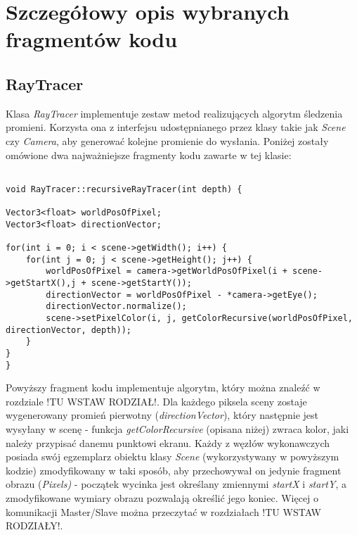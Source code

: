 \section{Szczegółowy opis wybranych fragmentów kodu}
	\subsection{RayTracer}

Klasa \emph{RayTracer} implementuje zestaw metod realizujących algorytm śledzenia promieni. Korzysta ona z interfejsu udostępnianego przez klasy takie jak \emph{Scene} czy \emph{Camera}, aby generować kolejne promienie do wysłania. Poniżej zostały omówione dwa najważniejsze fragmenty kodu zawarte w tej klasie:
	
\begin{lstlisting}[caption={Fragment klasy \emph{RayTracer}}]

void RayTracer::recursiveRayTracer(int depth) {

Vector3<float> worldPosOfPixel;
Vector3<float> directionVector;

for(int i = 0; i < scene->getWidth(); i++) {
    for(int j = 0; j < scene->getHeight(); j++) {
        worldPosOfPixel = camera->getWorldPosOfPixel(i + scene->getStartX(),j + scene->getStartY());
        directionVector = worldPosOfPixel - *camera->getEye();
        directionVector.normalize();
        scene->setPixelColor(i, j, getColorRecursive(worldPosOfPixel, directionVector, depth));
    }
}
}
\end{lstlisting}	

Powyższy fragment kodu implementuje algorytm, który można znaleźć w rozdziale !TU WSTAW RODZIAŁ!. Dla każdego piksela sceny zostaje wygenerowany promień pierwotny (\emph{directionVector}), który następnie jest wysyłany w scenę - funkcja \emph{getColorRecursive} (opisana niżej) zwraca kolor, jaki należy przypisać danemu punktowi ekranu. Każdy z węzłów wykonawczych posiada swój egzemplarz obiektu klasy \emph{Scene} (wykorzystywany w powyższym kodzie) zmodyfikowany w taki sposób, aby przechowywał on jedynie fragment obrazu (\emph{Pixels)} - początek wycinka jest określany zmiennymi \emph{startX} i \emph{startY}, a zmodyfikowane wymiary obrazu pozwalają określić jego koniec. Więcej o komunikacji Master/Slave można przeczytać w rozdziałach !TU WSTAW RODZIAŁY!. 

